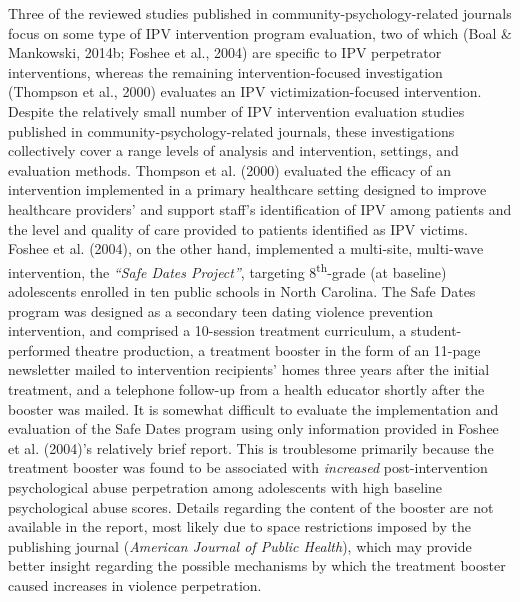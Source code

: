 \documentclass[11pt,]{tufte-book}
\begin{document}
Three of the reviewed studies published in community-psychology-related
journals focus on some type of IPV intervention program evaluation, two
of which (Boal \& Mankowski, 2014b; Foshee et al., 2004) are specific to
IPV perpetrator interventions, whereas the remaining
intervention-focused investigation (Thompson et al., 2000) evaluates an
IPV victimization-focused intervention. Despite the relatively small
number of IPV intervention evaluation studies published in
community-psychology-related journals, these investigations collectively
cover a range levels of analysis and intervention, settings, and
evaluation methods. Thompson et al. (2000) evaluated the efficacy of an
intervention implemented in a primary healthcare setting designed to
improve healthcare providers' and support staff's identification of IPV
among patients and the level and quality of care provided to patients
identified as IPV victims. Foshee et al. (2004), on the other hand,
implemented a multi-site, multi-wave intervention, the \emph{``Safe
Dates Project''}, targeting 8\textsuperscript{th}-grade (at baseline)
adolescents enrolled in ten public schools in North Carolina. The Safe
Dates program was designed as a secondary teen dating violence
prevention intervention, and comprised a 10-session treatment
curriculum, a student-performed theatre production, a treatment booster
in the form of an 11-page newsletter mailed to intervention recipients'
homes three years after the initial treatment, and a telephone follow-up
from a health educator shortly after the booster was mailed. It is
somewhat difficult to evaluate the implementation and evaluation of the
Safe Dates program using only information provided in Foshee et al.
(2004)'s relatively brief report. This is troublesome primarily because
the treatment booster was found to be associated with \emph{increased}
post-intervention psychological abuse perpetration among adolescents
with high baseline psychological abuse scores. Details regarding the
content of the booster are not available in the report, most likely due
to space restrictions imposed by the publishing journal (\emph{American
Journal of Public Health}), which may provide better insight regarding
the possible mechanisms by which the treatment booster caused increases
in violence perpetration.
\end{document}
